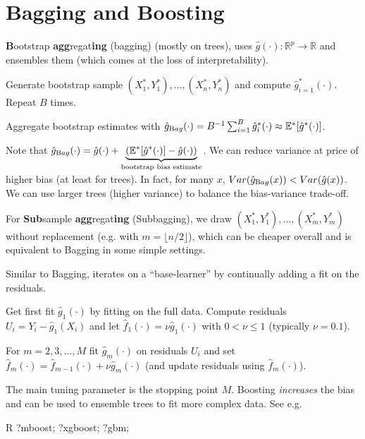 \section{Bagging and Boosting}\label{sec:bagging_and_boosting}
\begin{sectionbox}\nospacing{}
  \textbf{B}ootstrap \textbf{agg}regat\textbf{ing} (bagging) (mostly on trees), uses $\hat g(\cdot): \mathbb{R}^{p}\rightarrow \mathbb{R}$ and ensembles them (which comes at the loss of interpretability).
  \begin{enumeratenosep}[label=\roman*]
    \item Generate bootstrap sample $(X_{1}^{\ast}, Y_{1}^{\ast}), \dots, (X_{n}^{\ast}, Y_{n}^{\ast})$ and compute $\hat{g}^{\ast}_{i=1}(\cdot)$. Repeat $B$ times.
    \item Aggregate bootstrap estimates with $\hat{g}_{\textrm Bag}(\cdot) = B^{-1}\sum_{i=1}^{B} \hat{g}^{\ast}_{i}(\cdot) \approx \mathbb{E}^{\ast}[\hat{g}^{\ast}(\cdot)]$.
  \end{enumeratenosep}
  Note that $\hat{g}_{\textrm Bag}(\cdot) = \hat{g}(\cdot) + \underbrace{(\mathbb{E}^{\ast}[\hat{g}^{\ast}(\cdot)] -\hat{g}(\cdot))}_{\text{bootstrap bias estimate}}$.
  We can reduce variance at price of higher bias (at least for trees).
  In fact, for many $x$, $Var(\hat{g}_{\textrm Bag}(x)) < Var(\hat{g}(x))$. We can use larger trees (higher variance) to balance the bias-variance trade-off.

  For \textbf{Sub}sample \textbf{agg}regat\textbf{ing} (Subbagging), we draw $(X_{1}^{\ast}, Y_{1}^{\ast}), \dots, (X_{m}^{\ast}, Y_{m}^{\ast})$ without replacement (e.g. with $m = \lfloor n/2\rfloor$), which can be cheaper overall and is equivalent to Bagging in some simple settings.
\end{sectionbox}

\begin{sectionbox}[$L_{2}$Boosting]\nospacing{}
  Similar to Bagging, iterates on a ``base-learner'' by continually adding a fit on the residuals.
  \begin{enumeratenosep}[label=\roman*]
    \item Get first fit $\hat{g}_{1}(\cdot)$ by fitting on the full data. Compute residuals $U_{i} = Y_{i} - \hat{g}_{1}(X_{i})$ and let $\hat{f}_{1}(\cdot) = \nu \hat{g}_{1}(\cdot)$ with $0 < \nu \leq 1$ (typically $\nu = 0.1$).
    \item For $m = 2, 3, \dots, M$ fit $\hat{g}_{m}(\cdot)$ on residuals $U_{i}$ and set $\hat{f}_{m}(\cdot) = \hat{f}_{m-1}(\cdot) + \nu \hat{g}_{m}(\cdot)$ (and update residuals using $\hat{f}_{m}(\cdot)$).
  \end{enumeratenosep}
  The main tuning parameter is the stopping point $M$. Boosting \emph{increases} the bias and can be used to ensemble trees to fit more complex data. See e.g.
  \begin{mintlinebox}{R}
      ?mboost; ?xgboost; ?gbm;
  \end{mintlinebox}
\end{sectionbox}
